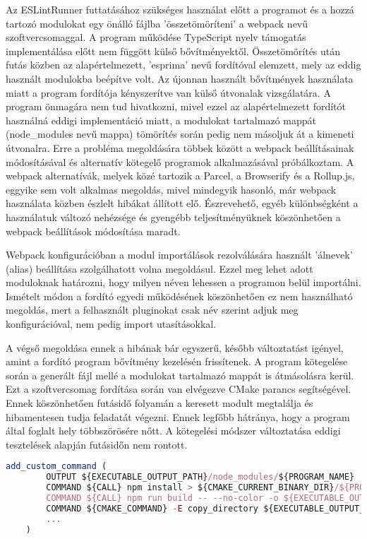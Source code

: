 Az ESLintRunner futtatásához szükséges használat előtt a programot és a hozzá tartozó modulokat egy önálló fájlba 'összetömöríteni' a webpack nevű szoftvercsomaggal. A program működése TypeScript nyelv támogatás implementálása előtt nem függött külső bővítményektől. Összetömörítés után futás közben az alapértelmezett, 'esprima' nevű fordítóval elemzett, mely az eddig használt modulokba beépítve volt. Az újonnan használt bővítmények használata miatt a program fordítója kényszerítve van külső útvonalak vizsgálatára. A program önmagára nem tud hivatkozni, mivel ezzel az alapértelmezett fordítót használná eddigi implementáció miatt, a modulokat tartalmazó mappát (node\_modules nevű mappa) tömörítés során pedig nem másoljuk át a kimeneti útvonalra. Erre a probléma megoldására többek között a webpack beállításainak módosításával és alternatív kötegelő programok alkalmazásával próbálkoztam. A webpack alternatívák, melyek közé tartozik a Parcel, a Browserify és a Rollup.js, eggyike sem volt alkalmas megoldás, mivel mindegyik hasonló, már webpack használata közben észlelt hibákat állított elő. Észrevehető, egyéb különbségként a használatuk változó nehézsége és gyengébb teljesítményüknek köszönhetően a webpack beállítások módosítása maradt.

Webpack konfigurációban a modul importálások rezolválására használt 'álnevek' (alias) beállítása szolgálhatott volna megoldásul. Ezzel meg lehet adott moduloknak határozni, hogy milyen néven lehessen a programon belül importálni. Ismételt módon a fordító egyedi működésének köszönhetően ez nem használható megoldás, mert a felhasznált pluginokat csak név szerint adjuk meg konfigurációval, nem pedig import utasításokkal.

A végső megoldása ennek a hibának bár egyszerű, később változtatást igényel, amint a fordító program bővítmény kezelésén frissítenek. A program kötegelése során a generált fájl mellé a modulokat tartalmazó mappát is átmásolásra kerül. Ezt a szoftvercsomag fordítása során van elvégezve CMake parancs segítségével. Ennek köszönhetően futásidő folyamán a keresett modult megtalálja és hibamentesen tudja feladatát végezni. Ennek legfőbb hátránya, hogy a program által foglalt hely többszörösére nőtt. A kötegelési módszer változtatása eddigi tesztelések alapján futásidőn nem rontott.

\begin{lstlisting}[caption={CMake parancs modul mappa másolására},label={lst:cmakeeslint}, language={JavaScript}]
    add_custom_command (
        OUTPUT ${EXECUTABLE_OUTPUT_PATH}/node_modules/${PROGRAM_NAME}
        COMMAND ${CALL} npm install > ${CMAKE_CURRENT_BINARY_DIR}/${PROGRAM_NAME}-npm-install.log 2>&1
        COMMAND ${CALL} npm run build -- --no-color -o ${EXECUTABLE_OUTPUT_PATH}/node_modules/${PROGRAM_NAME} > ${CMAKE_CURRENT_BINARY_DIR}/${PROGRAM_NAME}-npm-build.log 2>&1
        COMMAND ${CMAKE_COMMAND} -E copy_directory ${EXECUTABLE_OUTPUT_PATH}/tmp_${PROGRAM_NAME}/node_modules/ ${EXECUTABLE_OUTPUT_PATH}/node_modules/${PROGRAM_NAME}/node_modules/
        ...
    )
\end{lstlisting}

